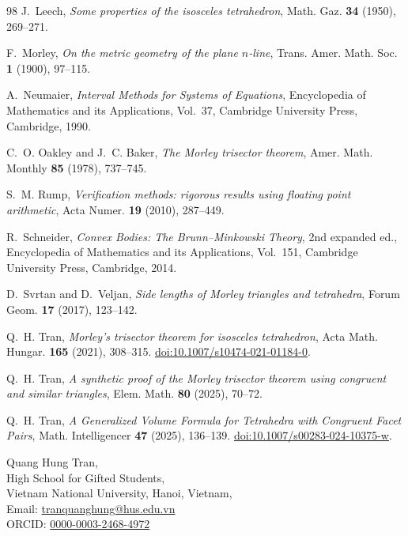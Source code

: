 \documentclass[11pt]{article}
\theoremstyle{definition}
\theoremstyle{remark}
\begin{document}
\begin{thebibliography}{98}
J.~Leech, \emph{Some properties of the isosceles tetrahedron}, Math. Gaz. \textbf{34} (1950), 269--271.

F.~Morley, \emph{On the metric geometry of the plane $n$-line}, Trans. Amer. Math. Soc. \textbf{1} (1900), 97--115.

A.~Neumaier, \emph{Interval Methods for Systems of Equations}, Encyclopedia of Mathematics and its Applications, Vol.~37, Cambridge University Press, Cambridge, 1990.

C.~O. Oakley and J.~C. Baker, \emph{The Morley trisector theorem}, Amer. Math. Monthly \textbf{85} (1978), 737--745.

S.~M. Rump, \emph{Verification methods: rigorous results using floating point arithmetic}, Acta Numer. \textbf{19} (2010), 287--449.

R.~Schneider, \emph{Convex Bodies: The Brunn--Minkowski Theory}, 2nd expanded ed., Encyclopedia of Mathematics and its Applications, Vol.~151, Cambridge University Press, Cambridge, 2014.

D.~Svrtan and D.~Veljan, \emph{Side lengths of Morley triangles and tetrahedra}, Forum Geom. \textbf{17} (2017), 123--142.

Q.~H. Tran, \emph{Morley's trisector theorem for isosceles tetrahedron}, Acta Math. Hungar. \textbf{165} (2021), 308--315. \href{https://doi.org/10.1007/s10474-021-01184-0}{doi:10.1007/s10474-021-01184-0}.

Q.~H. Tran, \emph{A synthetic proof of the Morley trisector theorem using congruent and similar triangles}, Elem. Math. \textbf{80} (2025), 70--72.

Q.~H. Tran, \emph{A Generalized Volume Formula for Tetrahedra with
Congruent Facet Pairs}, Math. Intelligencer \textbf{47} (2025),
136--139. \href{https://doi.org/10.1007/s00283-024-10375-w}
{doi:10.1007/s00283-024-10375-w}.

\end{thebibliography}

\begin{flushright}
Quang Hung Tran,\\
High School for Gifted Students,\\
Vietnam National University, Hanoi, Vietnam,\\
Email: \href{mailto:tranquanghung@hus.edu.vn}{tranquanghung@hus.edu.vn}\\
ORCID: \href{https://orcid.org/0000-0003-2468-4972}{0000-0003-2468-4972}
\end{flushright}
\end{document}
